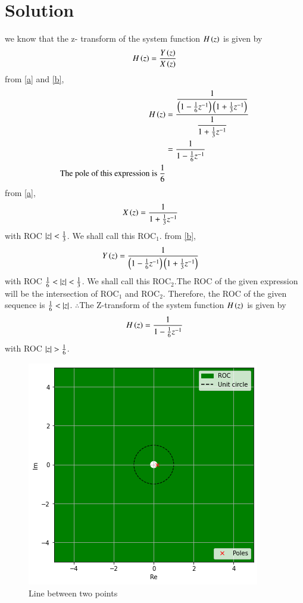 \documentclass[journal,12pt,twocolumn]{IEEEtran}
\begin{document}
\section{Solution}
we know that the z- transform of the system function $H\left(z\right)$ is given by 
\begin{align}
H\left(z\right) = \dfrac{Y\left(z\right)}{X\left(z\right)}
\end{align}
from \eqref{a} and \eqref{b},
\begin{align}
H\left(z\right) &= \dfrac{\dfrac{1}{\left(1- \frac{1}{6}z^{-1}\right)\left(1+ \frac{1}{3}z^{-1}\right)}}{\dfrac{1}{1+ \frac{1}{3}z^{-1}}}\\
&=\dfrac{1}{1- \frac{1}{6}z^{-1}}\\
\text{The pole of this expression is $\frac{1}{6}$}
\end{align}
from \eqref{a},
\begin{align}
 X\left(z\right) &= \dfrac{1}{1+ \frac{1}{3}z^{-1}}
\end{align}
with ROC $\vert z\vert < \frac{1}{3}$. We shall call this ROC$_1$.
from \eqref{b},
\begin{align}
Y\left(z\right) &= \dfrac{1}{\left(1- \frac{1}{6}z^{-1}\right)\left(1+ \frac{1}{3}z^{-1}\right)}
\end{align}
with ROC $\frac{1}{6} < \vert z\vert < \frac{1}{3}$. We shall call this ROC$_2$.The ROC of the given expression will be the intersection of ROC$_1$ and ROC$_2$. Therefore, the ROC of the given sequence is $\frac{1}{6} < \vert z\vert$.
$\therefore$The Z-transform of the system function $H\left(z\right)$ is given by 
 \begin{align}
H\left(z\right) =\dfrac{1}{1- \frac{1}{6}z^{-1}}
\end{align}
with ROC $ \vert z\vert > \frac{1}{6}  $.
%
\begin{figure}[!h]
         \centering
         \includegraphics[width=\columnwidth]{fig_1.png}
         \caption{ Line between two points}
         \label{plot}
\end{figure}
\end{document}
